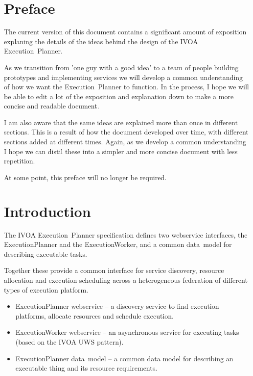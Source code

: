 \documentclass[11pt,a4paper]{ivoa}
\newcommand{\datamodel} {data~model}
\newcommand{\webservice} {webservice}
\newcommand{\ivoa} {IVOA}
\newcommand{\uws} {UWS}
\newcommand{\execplanner} {ExecutionPlanner}
\newcommand{\execworker} {ExecutionWorker}
\newcommand{\executionplanner} {Execution~Planner}
\begin{document}
\section{Preface}
\label{preface}

The current version of this document contains a significant amount of exposition
explaning the details of the ideas behind the design of the \ivoa{} \executionplanner{}.

As we transition from 'one guy with a good idea' to a team of people building prototypes
and implementing services we will develop a common understanding of how we want
the \executionplanner{} to function.
In the process, I hope we will be able to edit a lot of the exposition and explanation
down to make a more concise and readable document.

I am also aware that the same ideas are explained more than once in different sections.
This is a result of how the document developed over time, with different sections added at
different times.
Again, as we develop a common understanding I hope we can distil these into a simpler and
more concise document with less repetition.

At some point, this preface will no longer be required.

\section{Introduction}
\label{introduction}

The \ivoa{} \executionplanner{} specification defines two \webservice{} interfaces,
the \execplanner{} and the \execworker{}, and a common \datamodel{} for describing
executable tasks.

Together these provide a common interface for service discovery, resource allocation
and execution scheduling across a heterogeneous federation of different types of
execution platform.

\begin{itemize}
    \item \execplanner{} \webservice{} – a discovery service to find execution platforms, allocate resources and schedule execution.
    \item \execworker{} \webservice{} – an asynchronous service for executing tasks (based on the \ivoa{} \uws{} pattern).
    \item \execplanner{} \datamodel{} – a common data model for describing an executable thing and its resource requirements.
\end{itemize}
\end{document}
